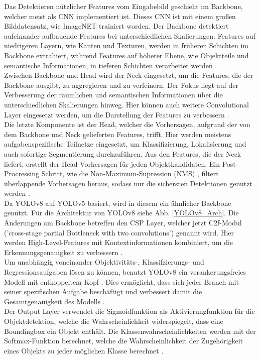 {{	Das Detektieren nützlicher Features vom Eingabebild geschieht im Backbone, welcher meist als CNN implementiert ist. Dieses CNN ist mit einem großen Bilddatensatz, wie ImageNET trainiert worden. Der Backbone detektiert aufeinander aufbauende Features bei unterschiedlichen Skalierungen. Features auf niedrigeren Layern, wie Kanten und Texturen, werden in früheren Schichten im Backbone extrahiert, während Features auf höherer Ebene, wie Objektteile und semantische Informationen, in tieferen Schichten verarbeitet werden \citep{Terven2023}. \\
	Zwischen Backbone und Head wird der Neck eingesetzt, um die Features, die der Backbone ausgibt, zu aggregieren und zu verfeinern. Der Fokus liegt auf der Verbesserung der räumlichen und semantischen Informationen über die unterschiedlichen Skalierungen hinweg. Hier können auch weitere Convolutional Layer eingesetzt werden, um die Darstellung der Features zu verbessern \citep{Terven2023}. \\
	Die letzte Komponente ist der Head, welcher die Vorhersagen, aufgrund der von dem Backbone und Neck gelieferten Features, trifft. Hier werden meistens aufgabenspezifische Teilnetze eingesetzt, um Klassifizierung, Lokalisierung und auch sofortige Segmentierung durchzuführen. Aus den Features, die der Neck liefert, erstellt der Head Vorhersagen für jeden Objektkandidaten. Ein Post-Procressing Schritt, wie die Non-Maximum-Supression (NMS) , filtert überlappende Vorhersagen heraus, sodass nur die sichersten Detektionen genutzt werden \citep{Terven2023}.\\
	Da YOLOv8 auf YOLOv5 basiert, wird in diesem ein ähnlicher Backbone genutzt. Für die Architektur von YOLOv8 siehe Abb. \ref{YOLOv8_Arch}. Die Änderungen am Backbone betreffen den CSP Layer, welcher jetzt C2f-Modul ('cross-stage partial Bottleneck with two convolutions') genannt wird. Hier werden High-Level-Features mit Kontextinformationen kombiniert, um die Erkennungsgenauigkeit zu verbessern \citep{Terven2023}. \\
	Um unabhängig voneinander Objektivitäts-, Klassifzierungs- und Regressionsaufgaben lösen zu können, benutzt YOLOv8 ein verankerungsfreies Modell mit entkoppeltem Kopf . Dies ermöglicht, dass sich jeder Branch mit seiner spezifischen Aufgabe beschäftigt und verbessert damit die Gesamtgenauigkeit des Modells \citep{Terven2023}. \\
	Der Output Layer verwendet die Sigmoidfunktion als Aktivierungfunktion für die Objektdetektion, welche die Wahrscheinlichkeit widerspiegelt, dass eine Boundingbox ein Objekt enthält. Die Klassenwahrscheinlichkeiten werden mit der Softmax-Funktion berechnet, welche die Wahrscheinlichkeit der Zugehörigkeit eines Objekts zu jeder möglichen Klasse berechnet \citep{Terven2023}. \\

}}
